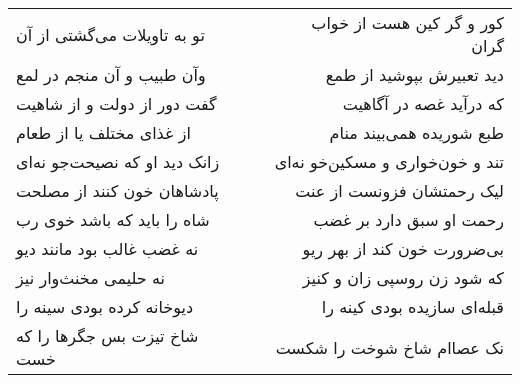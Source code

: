 \begin{center}
\begin{longtable}{l p{0.5cm} r}
تو به تاویلات می‌گشتی از آن
&&
کور و گر کین هست از خواب گران
\\
وآن طبیب و آن منجم در لمع
&&
دید تعبیرش بپوشید از طمع
\\
گفت دور از دولت و از شاهیت
&&
که درآید غصه در آگاهیت
\\
از غذای مختلف یا از طعام
&&
طبع شوریده همی‌بیند منام
\\
زانک دید او که نصیحت‌جو نه‌ای
&&
تند و خون‌خواری و مسکین‌خو نه‌ای
\\
پادشاهان خون کنند از مصلحت
&&
لیک رحمتشان فزونست از عنت
\\
شاه را باید که باشد خوی رب
&&
رحمت او سبق دارد بر غضب
\\
نه غضب غالب بود مانند دیو
&&
بی‌ضرورت خون کند از بهر ریو
\\
نه حلیمی مخنث‌وار نیز
&&
که شود زن روسپی زان و کنیز
\\
دیوخانه کرده بودی سینه را
&&
قبله‌ای سازیده بودی کینه را
\\
شاخ تیزت بس جگرها را که خست
&&
نک عصاام شاخ شوخت را شکست
\\
\end{longtable}
\end{center}
